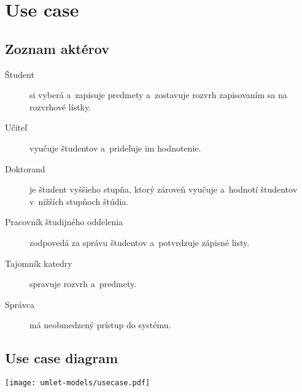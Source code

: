 \section{Use case}

\subsection{Zoznam aktérov}

\begin{description}
    \item[Študent] si vyberá a~zapisuje predmety a~zostavuje rozvrh
    zapisovaním sa na rozvrhové lístky.

    \item[Učiteľ] vyučuje študentov a~prideľuje im hodnotenie.

    \item[Doktorand] je študent vyššieho stupňa, ktorý zároveň vyučuje
    a~hodnotí študentov v~nižších stupňoch štúdia.

    \item[Pracovník študijného oddelenia] zodpovedá za správu študentov
    a~potvrdzuje zápisné listy.

    \item[Tajomník katedry] spravuje rozvrh a~predmety.

    \item[Správca] má neobmedzený prístup do systému.
\end{description}

\subsection{Use case diagram}

\texttt{[image: umlet-models/usecase.pdf]}
